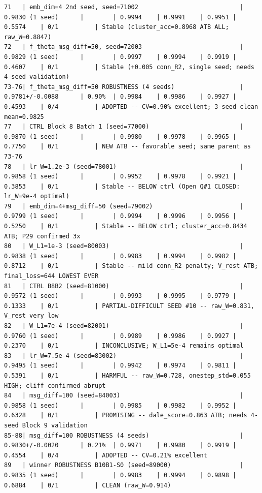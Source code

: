 \begin{tiny}
\begin{verbatim}
71   | emb_dim=4 2nd seed, seed=71002                            | 0.9830 (1 seed)      |        | 0.9994    | 0.9991    | 0.9951 | 0.5574    | 0/1          | Stable (cluster_acc=0.8968 ATB ALL; raw_W=0.8847)
72   | f_theta_msg_diff=50, seed=72003                           | 0.9829 (1 seed)      |        | 0.9997    | 0.9994    | 0.9919 | 0.4607    | 0/1          | Stable (+0.005 conn_R2, single seed; needs 4-seed validation)
73-76| f_theta_msg_diff=50 ROBUSTNESS (4 seeds)                  | 0.9781+/-0.0088      | 0.90%  | 0.9984    | 0.9986    | 0.9927 | 0.4593    | 0/4          | ADOPTED -- CV=0.90% excellent; 3-seed clean mean=0.9825
77   | CTRL Block 8 Batch 1 (seed=77000)                         | 0.9870 (1 seed)      |        | 0.9980    | 0.9978    | 0.9965 | 0.7750    | 0/1          | NEW ATB -- favorable seed; same parent as 73-76
78   | lr_W=1.2e-3 (seed=78001)                                  | 0.9858 (1 seed)      |        | 0.9952    | 0.9978    | 0.9921 | 0.3853    | 0/1          | Stable -- BELOW ctrl (Open Q#1 CLOSED: lr_W=9e-4 optimal)
79   | emb_dim=4+msg_diff=50 (seed=79002)                        | 0.9799 (1 seed)      |        | 0.9994    | 0.9996    | 0.9956 | 0.5250    | 0/1          | Stable -- BELOW ctrl; cluster_acc=0.8434 ATB; P29 confirmed 3x
80   | W_L1=1e-3 (seed=80003)                                    | 0.9838 (1 seed)      |        | 0.9983    | 0.9994    | 0.9982 | 0.8712    | 0/1          | Stable -- mild conn_R2 penalty; V_rest ATB; final_loss=644 LOWEST EVER
81   | CTRL B8B2 (seed=81000)                                    | 0.9572 (1 seed)      |        | 0.9993    | 0.9995    | 0.9779 | 0.1333    | 0/1          | PARTIAL-DIFFICULT SEED #10 -- raw_W=0.831, V_rest very low
82   | W_L1=7e-4 (seed=82001)                                    | 0.9760 (1 seed)      |        | 0.9989    | 0.9986    | 0.9927 | 0.2370    | 0/1          | INCONCLUSIVE; W_L1=5e-4 remains optimal
83   | lr_W=7.5e-4 (seed=83002)                                  | 0.9495 (1 seed)      |        | 0.9942    | 0.9974    | 0.9811 | 0.5391    | 0/1          | HARMFUL -- raw_W=0.728, onestep_std=0.055 HIGH; cliff confirmed abrupt
84   | msg_diff=100 (seed=84003)                                 | 0.9858 (1 seed)      |        | 0.9985    | 0.9982    | 0.9952 | 0.6328    | 0/1          | PROMISING -- dale_score=0.863 ATB; needs 4-seed Block 9 validation
85-88| msg_diff=100 ROBUSTNESS (4 seeds)                         | 0.9830+/-0.0020      | 0.21%  | 0.9971    | 0.9980    | 0.9919 | 0.4554    | 0/4          | ADOPTED -- CV=0.21% excellent
89   | winner ROBUSTNESS B10B1-S0 (seed=89000)                   | 0.9835 (1 seed)      |        | 0.9983    | 0.9994    | 0.9898 | 0.6884    | 0/1          | CLEAN (raw_W=0.914)

\end{verbatim}
\end{tiny}
